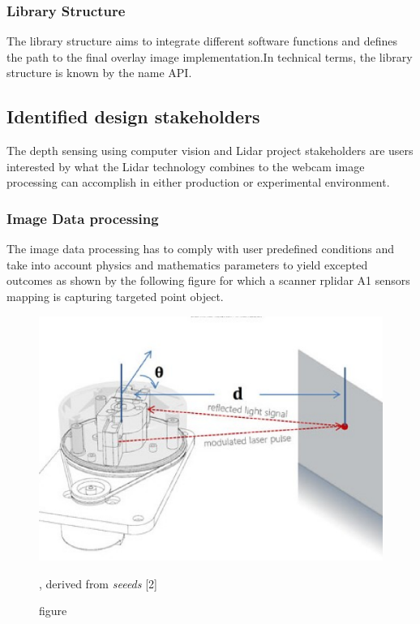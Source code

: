     	\subsubsection{Library Structure}
    	The library structure aims to integrate different software functions and defines the path to the final overlay image implementation.In technical terms, the library structure is known by the name API.
    	
    \subsection{Identified design stakeholders}
  The depth sensing using computer vision and Lidar project stakeholders are  users interested by what the Lidar technology combines to the webcam image processing can accomplish in either production or experimental environment.   
    
    	\subsubsection{Image Data processing}
    The image data processing has to comply with user predefined conditions and take into account physics and mathematics parameters to yield excepted outcomes as  shown by the following figure for which a scanner rplidar A1 sensors mapping  is capturing targeted point object.
     \\[2ex]
    	\begin{figure}[ht]
    	 \centering \includegraphics[scale=.5]{images/imageproc.eps}
    	\caption{figure}{, derived from  \textit{seeeds} }[2]\label{rplidar}
    	\end{figure}
       
